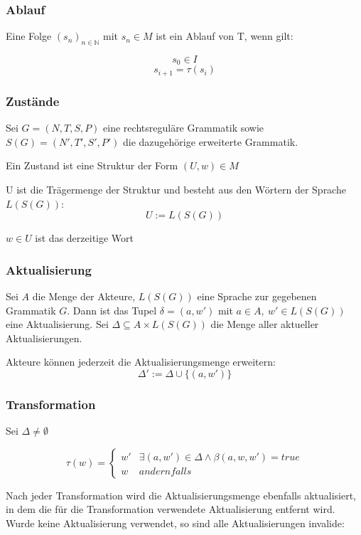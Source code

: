 \documentclass[]{article}
\begin{document}
\subsubsection*{Ablauf}
Eine Folge $(s_n)_{n\in\mathbb{N}}$ mit $s_n\in M$ ist ein Ablauf von T, wenn gilt:

\[ s_0 \in I \] 
\[ s_{i+1} = \tau(s_i) \] 

\subsubsection*{Zustände}

Sei $G = (N,T,S,P)$ eine rechtsreguläre Grammatik sowie
$S(G)=(N',T',S',P')$ die dazugehörige erweiterte Grammatik.

Ein Zustand ist eine Struktur der Form $(U, w) \in M$

U ist die Trägermenge der Struktur und besteht aus den Wörtern der Sprache $L(S(G))$:
\[U := L(S(G))\]

$w\in U$ ist das derzeitige Wort

\subsubsection*{Aktualisierung}
Sei $A$ die Menge der Akteure, $L(S(G))$ eine Sprache zur gegebenen Grammatik $G$. Dann ist das Tupel $\delta = (a,w')$ mit $a\in A,\ w'\in L(S(G))$ eine Aktualisierung. Sei $\Delta \subseteq A\times L(S(G))$ die Menge aller aktueller Aktualisierungen.

Akteure können jederzeit die Aktualisierungsmenge erweitern: 
\[ \Delta' := \Delta \cup \{(a,w')\} \] 


\subsubsection*{Transformation}
Sei $\Delta \neq \emptyset$ 

\[
  \tau( w ) = 
  \begin{cases}
    w'  & \exists (a,w') \in \Delta \land \beta(a,w,w') = true \\
    w   & andernfalls 
  \end{cases}
\] 

Nach jeder Transformation wird die Aktualisierungsmenge ebenfalls aktualisiert, in dem die für die Transformation verwendete Aktualisierung entfernt wird. Wurde keine Aktualisierung verwendet, so sind alle Aktualisierungen invalide:
\end{document}

